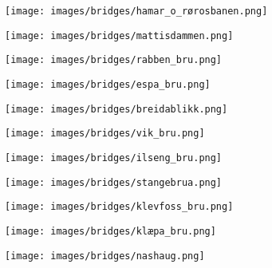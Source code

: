 
\begin{figure}[H]
    \centering
    \texttt{[image: images/bridges/hamar\_o\_rørosbanen.png]}
\end{figure}
            
\begin{figure}[H]
    \centering
    \texttt{[image: images/bridges/mattisdammen.png]}
\end{figure}
            
\begin{figure}[H]
    \centering
    \texttt{[image: images/bridges/rabben\_bru.png]}
\end{figure}
            
\begin{figure}[H]
    \centering
    \texttt{[image: images/bridges/espa\_bru.png]}
\end{figure}
            
\begin{figure}[H]
    \centering
    \texttt{[image: images/bridges/breidablikk.png]}
\end{figure}
            
\begin{figure}[H]
    \centering
    \texttt{[image: images/bridges/vik\_bru.png]}
\end{figure}
            
\begin{figure}[H]
    \centering
    \texttt{[image: images/bridges/ilseng\_bru.png]}
\end{figure}
            
\begin{figure}[H]
    \centering
    \texttt{[image: images/bridges/stangebrua.png]}
\end{figure}
            
\begin{figure}[H]
    \centering
    \texttt{[image: images/bridges/klevfoss\_bru.png]}
\end{figure}
            
\begin{figure}[H]
    \centering
    \texttt{[image: images/bridges/klæpa\_bru.png]}
\end{figure}
            
\begin{figure}[H]
    \centering
    \texttt{[image: images/bridges/nashaug.png]}
\end{figure}
            
